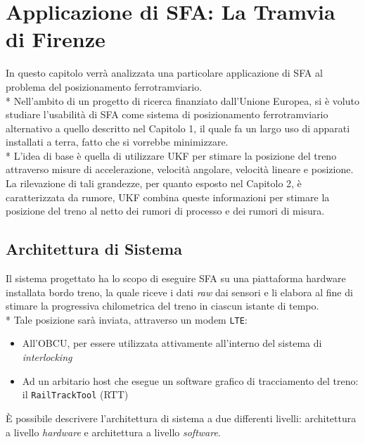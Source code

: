 \chapter{Applicazione di SFA: La Tramvia di Firenze}
In questo capitolo verr\`a analizzata una particolare applicazione di SFA al problema del posizionamento ferrotramviario.\\*
Nell'ambito di un progetto di ricerca finanziato dall'Unione Europea, si \`e voluto studiare l'usabilit\`a di SFA come sistema di posizionamento ferrotramviario alternativo a quello descritto nel Capitolo 1, il quale fa un largo uso di apparati installati a terra, fatto che si vorrebbe minimizzare.\\*
L'idea di base \`e quella di utilizzare UKF per stimare la posizione del treno attraverso misure di accelerazione, velocit\`a angolare, velocit\`a lineare e posizione. La rilevazione di tali grandezze, per quanto esposto nel Capitolo 2, \`e caratterizzata da rumore, UKF combina queste informazioni per stimare la posizione del treno al netto dei rumori di processo e dei rumori di misura.
\section{Architettura di Sistema}
Il sistema progettato ha lo scopo di eseguire SFA su una piattaforma hardware installata bordo treno, la quale riceve i dati \emph{raw} dai sensori e li elabora al fine di stimare la progressiva chilometrica del treno in ciascun istante di tempo.\\*
Tale posizione sar\`a inviata, attraverso un modem \texttt{LTE}:
\begin{itemize}
	\item All'OBCU, per essere utilizzata attivamente all'interno del sistema di \emph{interlocking}
	\item Ad un arbitario host che esegue un software grafico di tracciamento del treno: il \texttt{RailTrackTool} (RTT)
\end{itemize}
\`E possibile descrivere l'architettura di sistema a due differenti livelli: architettura a livello \emph{hardware} e architettura a livello \emph{software}.
